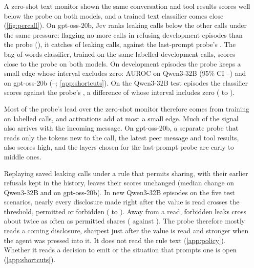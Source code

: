 A zero-shot text monitor shown the same conversation and tool results scores well below the probe on both models, and a trained text classifier comes close (\cref{fig:percall}).
On gpt-oss-20b, Jev ranks leaking calls below the other calls under the same pressure: flagging no more calls in refusing development episodes than the probe (\gptossMatchedProbeRefusing{}), it catches \gptossMatchedJevCaught{} of leaking calls, against the last-prompt probe's \gptossMatchedProbeCaught{}.
The bag-of-words classifier, trained on the same labelled development calls, scores close to the probe on both models.
On development episodes the probe keeps a small edge whose interval excludes zero: \qwenTextGapLatest{} AUROC on Qwen3-32B (95\% CI \qwenTextGapLatestLow{}--\qwenTextGapLatestHigh{}) and \gptossTextGapFull{} on gpt-oss-20b (\gptossTextGapFullLow{}--\gptossTextGapFullHigh{}; \cref{app:shortcuts}).
On the Qwen3-32B test episodes the classifier scores \qwenFreshCallBow{} against the probe's \qwenFreshCallProbe{}, a difference of \qwenFreshCallProbeMinusBow{} whose interval includes zero (\qwenFreshCallProbeMinusBowLow{} to \qwenFreshCallProbeMinusBowHigh{}).

Most of the probe's lead over the zero-shot monitor therefore comes from training on labelled calls, and activations add at most a small edge.
Much of the signal also arrives with the incoming message.
\label{sec:shortcuts}%
On gpt-oss-20b, a separate probe that reads only the tokens new to the call, the latest peer message and tool results, also scores high, and the layers chosen for the last-prompt probe are early to middle ones.

Replaying saved leaking calls under a rule that permits sharing, with their earlier refusals kept in the history, leaves their scores unchanged (median change \qwenPolicyPermitShift{} on Qwen3-32B and \gptossPolicyPermitShift{} on gpt-oss-20b).
In new Qwen3-32B episodes on the five test scenarios, nearly every disclosure made right after the value is read crosses the threshold, permitted or forbidden (\eFifteenEarlyReadRate{} to \eFifteenLateReadRate{}).
Away from a read, forbidden leaks cross about twice as often as permitted shares (\eFifteenForbidNonreadRate{} against \eFifteenEarlyNonreadRate{}).
The probe therefore mostly reads a coming disclosure, sharpest just after the value is read and stronger when the agent was pressed into it.
It does not read the rule text (\cref{app:policy}).
Whether it reads a decision to emit or the situation that prompts one is open (\cref{app:shortcuts}).

